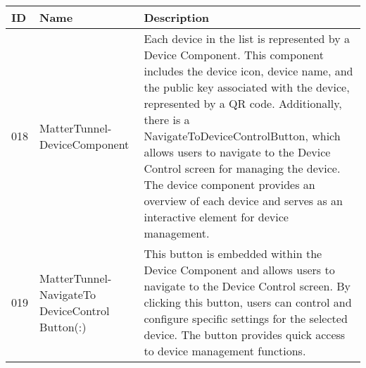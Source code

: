 \documentclass[conference]{IEEEtran}
\begin{document}
\begin{enumerate}[itemsep=2ex, parsep=1ex]
\begin{enumerate}[itemsep=2ex, parsep=1ex]
	      	      \vspace{10cm}
	      	      
	      	      \begin{table}[h!]
	      	      	\def\arraystretch{1.24} \small
	      	      	\begin{tabular}{|p{1.2cm}|p{2.5cm}|p{4.0cm}|}
	      	      		\hline
	      	      		ID  & Name                                            & Description                                                                                                                                                                                                                                                                                                                                                                                                                                                    \\
	      	      		\hline
	      	      		018 & MatterTunnel-DeviceComponent                    & Each device in the list is represented by a Device Component. This component includes the device icon, device name, and the public key associated with the device, represented by a QR code. Additionally, there is a NavigateToDeviceControlButton, which allows users to navigate to the Device Control screen for managing the device. The device component provides an overview of each device and serves as an interactive element for device management. \\
	      	      		\hline
	      	      		019 & MatterTunnel-NavigateTo DeviceControl Button(:) & This button is embedded within the Device Component and allows users to navigate to the Device Control screen. By clicking this button, users can control and configure specific settings for the selected device. The button provides quick access to device management functions.                                                                                                                                                                            \\
	      	      		\hline
	      	      	\end{tabular}
	      	      \end{table}
	      	      

\end{enumerate}
\end{enumerate}
\end{document}
